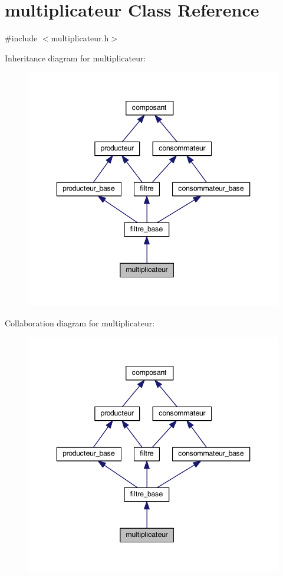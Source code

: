 \hypertarget{classmultiplicateur}{\section{multiplicateur Class Reference}
\label{classmultiplicateur}
}


{\ttfamily \#include $<$multiplicateur.\-h$>$}



Inheritance diagram for multiplicateur\-:
\nopagebreak
\begin{figure}[H]
\begin{center}
\leavevmode
\includegraphics[width=346pt]{classmultiplicateur__inherit__graph}
\end{center}
\end{figure}


Collaboration diagram for multiplicateur\-:
\nopagebreak
\begin{figure}[H]
\begin{center}
\leavevmode
\includegraphics[width=346pt]{classmultiplicateur__coll__graph}
\end{center}
\end{figure}
